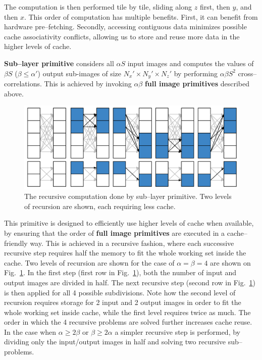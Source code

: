   The computation is then performed tile by tile, sliding along $z$
  first, then $y$, and then $x$.  This order of computation has
  multiple benefits.  First, it can benefit from hardware
  pre--fetching.  Secondly, accessing contiguous data minimizes
  possible cache associativity conflicts, allowing us to store and reuse more
  data in the higher levels of cache. 

  {\bf Sub--layer primitive} considers all $\alpha S$ input images and
  computes the values of $\beta S$ ($\beta \le \alpha'$) output
  sub-images of size $N_x' \times N_y' \times N_z'$ by performing
  $\alpha \beta S^2$ cross--correlations.  This is achieved by invoking
  $\alpha \beta$ {\bf full image primitives} described above.

  \begin{figure}
    \begin{center}
      \includegraphics[width=0.8\linewidth]{fig/serialexec}
    \end{center}
    \caption{The recursive computation done by sub--layer primitive.
      Two levels of recursion are shown, each requiring less cache. }
    \label{fig:full-exec}
  \end{figure}

  This primitive is designed to efficiently use higher levels of cache
  when available, by ensuring that the order of {\bf full image
    primitives} are executed in a cache--friendly way.  This is
  achieved in a recursive fashion, where each successive recursive
  step requires half the memory to fit the whole working set inside
  the cache.  Two levels of recursion are shown for the case of
  $\alpha = \beta = 4$ are shown on Fig.~\ref{fig:full-exec}.  In the
  first step (first row in Fig.~\ref{fig:full-exec}), both the number
  of input and output images are divided in half.  The next recursive
  step (second row in Fig.~\ref{fig:full-exec}) is then applied for
  all 4 possible subdivisions.  Note how the second level of recursion
  requires storage for 2 input and 2 output images in order to fit the
  whole working set inside cache, while the first level requires twice
  as much.  The order in which the 4 recursive problems are solved
  further increases cache reuse.  In the case when $\alpha \ge 2\beta$
  or $\beta \ge 2\alpha$ a simpler recursive step is performed, by
  dividing only the input/output images in half and solving two
  recursive sub--problems.

